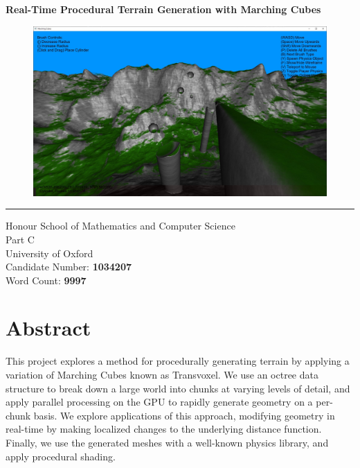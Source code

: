 \documentclass[11pt]{article}
\begin{document}
% 



\begin{titlepage}
  \begin{center}
    \huge
    \textbf{Real-Time Procedural Terrain Generation with Marching Cubes}
    \vspace{48pt}
  \begin{figure}[H]
    \includegraphics[width=\textwidth]{shaded_mountains.jpg}
  \end{figure}
  \noindent\rule{\textwidth}{1pt}
  \LARGE
  Honour School of Mathematics and Computer Science\\
  \vspace{18pt}
  Part C\\
  \vspace{18pt}
  University of Oxford\\
  \vspace{48pt}
  \large
  Candidate Number: \textbf{1034207}\\
  Word Count: \textbf{9997}
  \end{center}
\end{titlepage}

\newpage

\section*{Abstract} 
This project explores a method for procedurally generating terrain by applying a variation of Marching Cubes known as Transvoxel. We use an octree data structure to break down a large world into chunks at varying levels of detail, and apply parallel processing on the GPU to rapidly generate geometry on a per-chunk basis. We explore applications of this approach, modifying geometry in real-time by making localized changes to the underlying distance function. Finally, we use the generated meshes with a well-known physics library, and apply procedural shading.
\newpage
\end{document}
